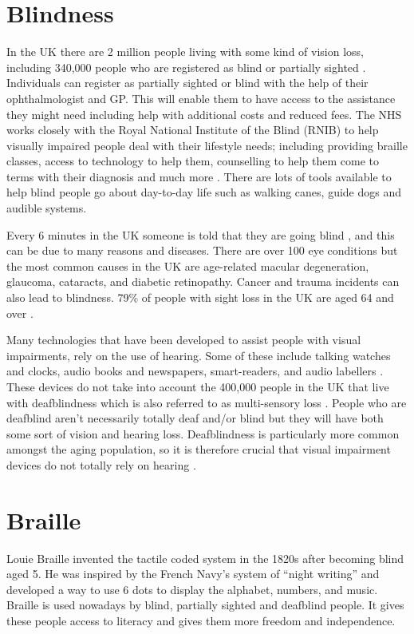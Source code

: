 \section{Blindness}
In the UK there are 2 million people living with some kind of vision loss, including 340,000 people who are registered as blind or partially sighted .
Individuals can register as partially sighted or blind with the help of their ophthalmologist and GP. This will enable them to have access to the assistance they might need including help with additional costs and reduced fees.
The NHS works closely with the Royal National Institute of the Blind (RNIB) to help visually impaired people deal with their lifestyle needs; including providing braille classes, access to technology to help them, counselling to help them come to terms with their diagnosis and much more \cite{national_health_system_england_blindness_2017,royal_national_institute_of_blind_people_key_nodate}.
There are lots of tools available to help blind people go about day-to-day life such as walking canes, guide dogs and audible systems.  

Every 6 minutes in the UK someone is told that they are going blind \cite{fight_for_sight_facts_nodate}, and this can be due to many reasons and diseases.
There are over 100 eye conditions but the most common causes in the UK are age-related macular degeneration, glaucoma, cataracts, and diabetic retinopathy.
Cancer and trauma incidents can also lead to blindness.
79\% of people with sight loss in the UK are aged 64 and over \cite{royal_national_institute_of_blind_people_key_nodate}.  

Many technologies that have been developed to assist people with visual impairments, rely on the use of hearing.
Some of these include talking watches and clocks, audio books and newspapers, smart-readers, and audio labellers \cite{royal_national_institute_of_blind_people_audio_nodate}. 
These devices do not take into account the 400,000 people in the UK that live with deafblindness which is also referred to as multi-sensory loss .
People who are deafblind aren't necessarily totally deaf and/or blind but they will have both some sort of vision and hearing loss.
Deafblindness is particularly more common amongst the aging population, so it is therefore crucial that visual impairment devices do not totally rely on hearing \cite{sense_deafblindness_nodate,deafblind_uk_what_nodate,national_health_system_england_deafblindness_2017}.  

\section{Braille}
Louie Braille invented the tactile coded system in the 1820s after becoming blind aged 5.
He was inspired by the French Navy's system of ``night writing'' and developed a way to use 6 dots to display the alphabet, numbers, and music.
Braille is used nowadays by blind, partially sighted and deafblind people.
It gives these people access to literacy and gives them more freedom and independence.  

